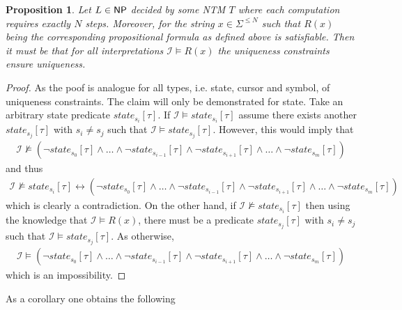 \documentclass [11pt]{article}
\newtheorem{proposition}[theorem]{Proposition}
\newcommand{\liff}{\leftrightarrow}
\newcommand{\nmodels}{\not\models}
\newcommand{\ccfont}[1]{\protect\mathsf{#1}}
\newcommand{\NP}{\ccfont{NP}}
\newcommand{\state}[2]{\textit{state}_{#1}[#2]}
\begin{document}
\begin{proposition}
\label{prop:unique}
Let $L\in \NP$ decided by some NTM $T$ where each computation requires exactly $N$ steps. Moreover, for the string $x \in \Sigma^{\leq N}$ such that $R(x)$  being the corresponding propositional formula as defined above is satisfiable.
Then it must be that for all interpretations $\mathcal{I} \models R(x)$ the uniqueness constraints ensure uniqueness.
\end{proposition}
\begin{proof}
As the poof is analogue for all types, i.e. state, cursor and symbol, of uniqueness constraints. The claim will only be demonstrated for state.
Take an arbitrary state predicate $\state{s_i}{\tau}$. If $\mathcal{I}\models \state{s_i}{\tau}$ assume there exists another $\state{s_j}{\tau}$ with $s_i \neq s_j$ such that $\mathcal{I} \models \state{s_j}{\tau}$. However, this would imply that 
\begin{equation*}
\begin{split}
\mathcal{I} \nmodels (\neg \state{s_0}{\tau} \wedge \dots \wedge \neg \state{s_{i-1}}{\tau} \wedge  \neg \state{s_{i+1}}{\tau} \wedge \dots \wedge \neg \state{s_{m}}{\tau})
\end{split}
\end{equation*}
and thus
\begin{equation*}
\begin{split}
\mathcal{I} \nmodels\state{s_i}{\tau}  \liff  (\neg \state{s_0}{\tau} \wedge \dots \wedge \neg \state{s_{i-1}}{\tau} \wedge  \neg \state{s_{i+1}}{\tau} \wedge \dots \wedge \neg \state{s_{m}}{\tau})
\end{split}
\end{equation*}
which is clearly a contradiction.
On the other hand, if $\mathcal{I}\nmodels \state{s_i}{\tau}$ then using the knowledge that $\mathcal{I} \models R(x)$, there must be a predicate $\state{s_j}{\tau}$ with $s_i \neq s_j$ such that $\mathcal{I} \models \state{s_j}{\tau}$. As otherwise,
\begin{equation*}
\begin{split}
\mathcal{I} \models (\neg \state{s_0}{\tau} \wedge \dots \wedge \neg \state{s_{i-1}}{\tau} \wedge  \neg \state{s_{i+1}}{\tau} \wedge \dots \wedge \neg \state{s_{m}}{\tau})
\end{split}
\end{equation*}
which is an impossibility.
\end{proof}


As a corollary one obtains the following
\end{document}
